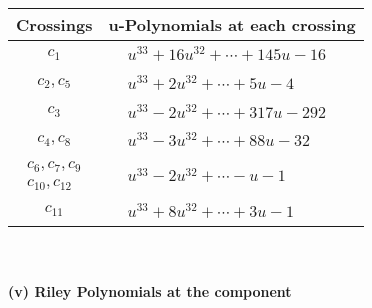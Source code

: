 \documentclass[1p]{elsarticle_modified}
\theoremstyle{definition}
\begin{document}
\begin{tabular}{m{50pt}|m{274pt}}
Crossings & \hspace{64pt}u-Polynomials at each crossing \\
\hline $$\begin{aligned}c_{1}\end{aligned}$$&$\begin{aligned}
&u^{33}+16 u^{32}+\cdots+145 u-16
\end{aligned}$\\
\hline $$\begin{aligned}c_{2},c_{5}\end{aligned}$$&$\begin{aligned}
&u^{33}+2 u^{32}+\cdots+5 u-4
\end{aligned}$\\
\hline $$\begin{aligned}c_{3}\end{aligned}$$&$\begin{aligned}
&u^{33}-2 u^{32}+\cdots+317 u-292
\end{aligned}$\\
\hline $$\begin{aligned}c_{4},c_{8}\end{aligned}$$&$\begin{aligned}
&u^{33}-3 u^{32}+\cdots+88 u-32
\end{aligned}$\\
\hline $$\begin{aligned}c_{6},c_{7},c_{9}\\c_{10},c_{12}\end{aligned}$$&$\begin{aligned}
&u^{33}-2 u^{32}+\cdots- u-1
\end{aligned}$\\
\hline $$\begin{aligned}c_{11}\end{aligned}$$&$\begin{aligned}
&u^{33}+8 u^{32}+\cdots+3 u-1
\end{aligned}$\\
\hline
\end{tabular}\\~\\
\newpage\renewcommand{\arraystretch}{1}
\flushleft \textbf{(v) Riley Polynomials at the component}\newline \\
\end{document}
